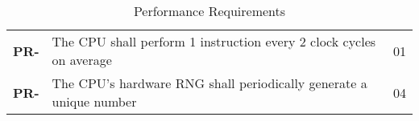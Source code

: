 \resetfyshcounter
\newcommand{\pr}[2]{
	\textbf{PR-\rc} & #1 & #2 \\
	\hline
}
\begin{table}[H]
	\begin{tabularx}{\textwidth}{| a | x | a |}
		\hline
		 &  &  \\
		\hline
		\pr{The CPU shall perform 1 instruction every 2 clock cycles on average}%
		{01}

		\pr{The CPU's hardware RNG shall periodically generate a unique number}%
		{04}

	\end{tabularx}
	\caption{Performance Requirements}
\end{table}

